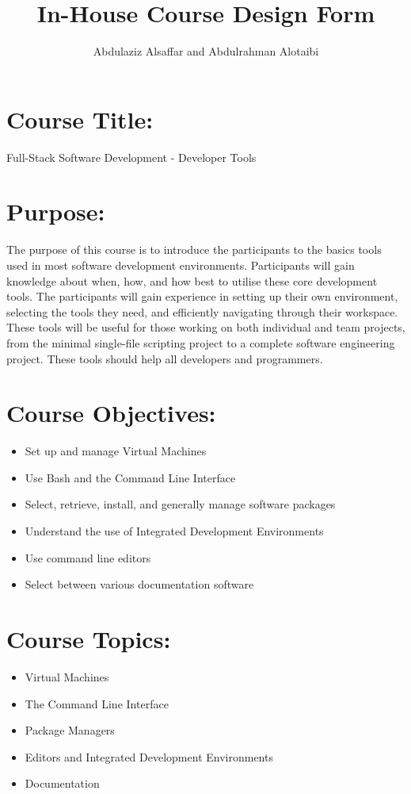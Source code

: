 \documentclass[a4paper,11pt]{article}
\author{Abdulaziz Alsa{f}far and Abdulrahman Alotaibi}
\title{In-House Course Design Form}
\begin{document}
\pagestyle{plain}
\setcounter{page}{1}

\section{Course Title:}
Full-Stack Software Development - Developer Tools

\section{Purpose:}
The purpose of this course is to introduce the participants to the basics tools used in most software development environments.
Participants will gain knowledge about when, how, and how best to utilise these core development tools. 
The participants will gain experience in setting up their own environment, selecting the tools they need, and e{f}ficiently navigating through their workspace. These tools will be useful for those working on both individual and team projects, from the minimal single-{f}ile scripting project to a complete software engineering project. These tools should help all developers and programmers.

\section{Course Objectives:}
\begin{itemize}
	\item Set up and manage Virtual Machines
	\item Use Bash and the Command Line Interface
	\item Select, retrieve, install, and generally manage software packages
	\item Understand the use of Integrated Development Environments
	\item Use command line editors
	\item Select between various documentation software
\end{itemize}

\section{Course Topics:}
\begin{itemize}
	\item Virtual Machines
	\item The Command Line Interface
	\item Package Managers
	\item Editors and Integrated Development Environments
	\item Documentation
\end{itemize}
\end{document}
